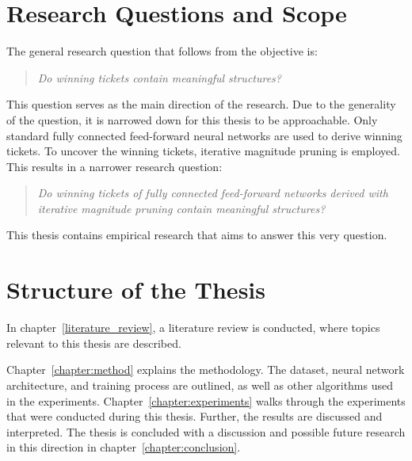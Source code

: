 \section{Research Questions and Scope}
The general research question that follows from the objective is: 
\begin{quote}
\textit{Do winning tickets contain meaningful structures?}
\end{quote}

This question serves as the main direction of the research.
Due to the generality of the question, it is narrowed down for this thesis to be approachable.
Only standard fully connected feed-forward neural networks are used to derive winning tickets.
To uncover the winning tickets, iterative magnitude pruning is employed.
This results in a narrower research question:

\begin{quote}
\textit{Do winning tickets of fully connected feed-forward networks derived with iterative magnitude pruning contain meaningful structures?}
\end{quote}

This thesis contains empirical research that aims to answer this very question.


\section{Structure of the Thesis}
In chapter~\ref{literature_review}, a literature review is conducted, where topics relevant to this thesis are described.

Chapter~\ref{chapter:method} explains the methodology.
The dataset, neural network architecture, and training process are outlined, as well as other algorithms used in the experiments.
Chapter~\ref{chapter:experiments}  walks through the experiments that were conducted during this thesis.
Further, the results are discussed and interpreted.
The thesis is concluded with a discussion and possible future research in this direction in chapter~\ref{chapter:conclusion}.